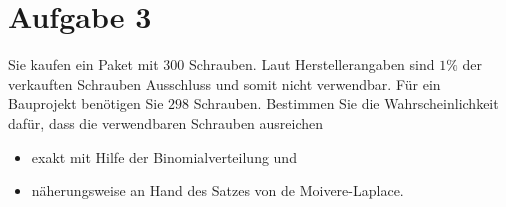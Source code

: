 \section{Aufgabe 3}

Sie kaufen ein Paket mit 300 Schrauben. Laut Herstellerangaben sind $1\%$ der verkauften Schrauben Ausschluss und somit nicht verwendbar. Für ein Bauprojekt benötigen Sie $298$ Schrauben. Bestimmen Sie die Wahrscheinlichkeit dafür, dass die verwendbaren Schrauben ausreichen

\begin{itemize}
    \item exakt mit Hilfe der Binomialverteilung und
    \item näherungsweise an Hand des Satzes von de Moivere-Laplace.
\end{itemize}